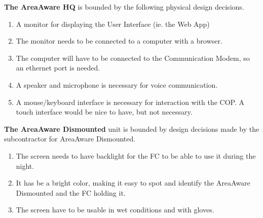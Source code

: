 \noindent \textbf{The AreaAware HQ} is bounded by the following physical design decisions.
\begin{enumerate}[label=D-HQ\arabic*,leftmargin=1.4cm]
	\item A monitor for displaying the User Interface (ie. the Web App)
	\item The monitor needs to be connected to a computer with a browser.
	\item The computer will have to be connected to the Communication Modem, so an ethernet port is needed.
	\item A speaker and microphone is necessary for voice communication. \\
	\item A mouse/keyboard interface is necessary for interaction with the COP. A touch interface would be nice to have, but not necessary.
\end{enumerate}

\noindent \textbf{The AreaAware Dismounted} unit is bounded by design decisions made by the subcontractor for AreaAware Dismounted.
\begin{enumerate}[label=D-D\arabic*,leftmargin=1.1cm]
  \item The screen needs to have backlight for the FC to be able to use it during the night.
  \item It has be a bright color, making it easy to spot and identify the AreaAware Dismounted and the FC holding it.
  \item The screen have to be usable in wet conditions and with gloves.
\end{enumerate}